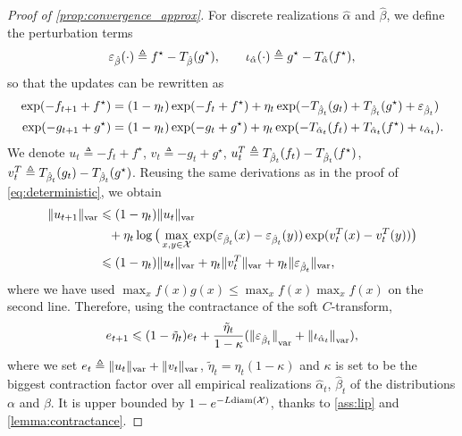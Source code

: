 \begin{proof}[Proof of \autoref{prop:convergence_approx}]
For discrete realizations $\hat \alpha$ and $\hat \beta$, we define the perturbation terms
\begin{equation}
    \epsilon_{\hat \beta}(\cdot) \triangleq
    f^\star - \Ctrans{g^\star}{\hat \beta} ,\qquad
    \iota_{\hat \alpha}(\cdot) \triangleq 
    g^\star - \Ctrans{f^\star}{\hat \alpha},
\end{equation}
so that the updates can be rewritten as
\begin{align}
    \exp(-f_{t+1} + f^\star) &= (1 - \eta_t)
    \exp(-f_{t} + f^\star)
    + \eta_t \exp(-\Ctrans{g_t}{\hat \beta_t} 
    +\Ctrans{g^\star}{\hat \beta_t} + \epsilon_{\hat \beta_t}) \\
    \exp(-g_{t+1} + g^\star) &= (1 - \eta_t)
    \exp(-g_{t} + g^\star)
    + \eta_t \exp(-\Ctrans{f_t}{\hat \alpha_t} 
    +\Ctrans{f^\star}{\hat \alpha_t} + \iota_{\hat \alpha_t}).
\end{align}
We denote $u_t \triangleq -f_{t} + f^\star$, $v_t \triangleq -g_{t} + g^\star$, $u_t^T \triangleq
\Ctrans{f_t}{\hat \beta_t} - \Ctrans{f^\star}{\hat \beta_t}$, $v_t^T \triangleq
\Ctrans{g_t}{\hat \beta_t} - \Ctrans{g^\star}{\hat \beta_t}$. Reusing the same
derivations as in the proof of \autoref{eq:deterministic}, we obtain
    \label{eq:pre_ineq_var}
    \begin{align}
    \Vert u_{t+1} \Vert_{\var} &\leq
    (1 - \eta_t) \Vert u_t \Vert_{\var}
    \\
    &\phantom{=}+ \eta_t \log \big( \max_{x, y \in \Xx}
    \exp(\epsilon_{\hat \beta_t}(x) 
    - \epsilon_{\hat \beta_t}(y)) \exp(v_t^T(x) - v_t^T(y)) \big) \\ 
    &\leq
    (1 - \eta_t) \Vert u_t \Vert_{\var}
    + \eta_t \Vert v_t^T \Vert_{\var}
    + \eta_t \Vert \epsilon_{\hat \beta_t} \Vert_{\var},
\end{align}
where we have used $\max_x f(x) g(x) \leq \max_x f(x) \max_x f(x)$ on the second line. Therefore,
using the contractance of the soft $C$-transform,
\begin{equation}
    \label{eq:ineq_var}
    e_{t+1} \leq 
    (1 - \tilde \eta_t) e_t
    +  \frac{\tilde \eta_t}{1 -\kappa}
    ({\Vert \epsilon_{\hat \beta_t} \Vert}_{\var} + 
    {\Vert \iota_{\hat \alpha_t} \Vert}_{\var}),
\end{equation}
where we set $e_t \triangleq \Vert u_t \Vert_{\var} + \Vert v_t \Vert_{\var}$,
$\tilde \eta_t = \eta_t (1-\kappa)$ and $\kappa$ is set to be the biggest
contraction factor over all empirical realizations $\hat \alpha_t$, $\hat
\beta_t$ of the distributions $\alpha$ and $\beta$. It is upper bounded by $1 -
e^{- L\text{diam}(\Xx)}$, thanks to \autoref{ass:lip} and
\autoref{lemma:contractance}.


\end{proof}
